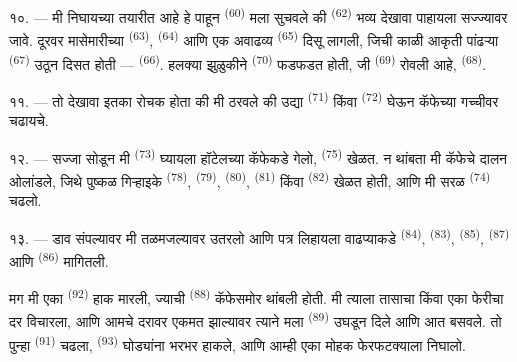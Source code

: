 १०. --- मी निघायच्या तयारीत आहे हे पाहून  \textsuperscript{(60)} मला
सुचवले की  \textsuperscript{(62)} भव्य देखावा पाहायला सज्ज्यावर जावे. दूरवर
मासेमारीच्या  \textsuperscript{(63)}, 
\textsuperscript{(64)} आणि एक अवाढव्य  \textsuperscript{(65)} दिसू लागली,
जिची काळी आकृती पांढऱ्या  \textsuperscript{(67)} उठून दिसत होती —
 \textsuperscript{(66)}. हलक्या झुळुकीने 
\textsuperscript{(70)} फडफडत होती, जी  \textsuperscript{(69)} रोवली आहे,
 \textsuperscript{(68)}.

\VUsaut{3.0mm}
\VUsaut{3.0mm}

११. --- तो देखावा इतका रोचक होता की मी ठरवले की उद्या 
\textsuperscript{(71)} किंवा  \textsuperscript{(72)} घेऊन कॅफेच्या गच्चीवर
चढायचे.

१२. --- सज्जा सोडून मी  \textsuperscript{(73)} घ्यायला हॉटेलच्या कॅफेकडे गेलो,
 \textsuperscript{(75)} खेळत. न थांबता मी कॅफेचे दालन ओलांडले, जिथे
पुष्कळ गिऱ्हाइके  \textsuperscript{(78)}, 
\textsuperscript{(79)},  \textsuperscript{(80)}, 
\textsuperscript{(81)} किंवा  \textsuperscript{(82)} खेळत होती, आणि मी सरळ
 \textsuperscript{(74)} चढलो.

१३. --- डाव संपल्यावर मी तळमजल्यावर उतरलो आणि पत्र लिहायला वाढप्याकडे 
\textsuperscript{(84)},  \textsuperscript{(83)}, 
\textsuperscript{(85)},  \textsuperscript{(87)} आणि 
\textsuperscript{(86)} मागितली.

मग मी एका  \textsuperscript{(92)} हाक मारली, ज्याची 
\textsuperscript{(88)} कॅफेसमोर थांबली होती. मी त्याला तासाचा किंवा एका फेरीचा दर विचारला, आणि
आमचे दरावर एकमत झाल्यावर त्याने मला  \textsuperscript{(89)} उघडून दिले आणि
आत बसवले. तो पुन्हा  \textsuperscript{(91)} चढला, 
\textsuperscript{(93)} घोड्यांना भरभर हाकले, आणि आम्ही एका मोहक फेरफटक्याला निघालो.

\VUsaut{6.0mm}
\VUfilet{22mm}
